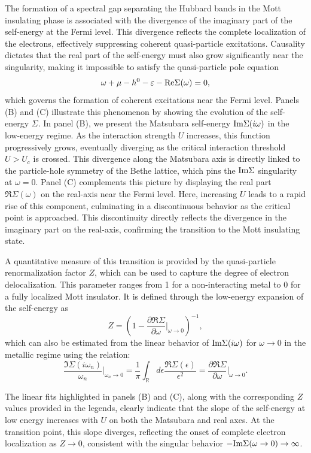 \documentclass[edipack_sp.tex]{subfiles}
\begin{document}
The formation of a spectral gap separating the Hubbard bands in the 
Mott insulating phase is associated with the divergence of the 
imaginary part of the self-energy at the Fermi level. This divergence 
reflects the complete localization of the electrons, effectively 
suppressing coherent quasi-particle excitations. Causality dictates that the real part of the self-energy must also 
grow significantly near the singularity, making it impossible to 
satisfy the quasi-particle pole equation
$$
\omega+\mu-h^0-\varepsilon-{\rm Re}{\Sigma}(\omega)=0,
$$
which governs the formation of coherent excitations near the Fermi 
level.
Panels (B) and (C) illustrate this phenomenon by showing the evolution of the self-energy $\Sigma$. In panel (B), we present the Matsubara self-energy ${\rm Im}\Sigma(i\omega)$ in the low-energy regime. As the  interaction strength $U$ increases, this function progressively grows, eventually diverging as the critical interaction threshold $U > U_\mathrm{c}$ is crossed.
This divergence along the Matsubara axis is directly linked to the
particle-hole symmetry of the Bethe lattice, which pins the  ${\rm
  Im}\Sigma$ singularity at $\omega = 0$.
Panel (C) complements this picture by displaying the real part 
$\Re{\Sigma}(\omega)$ on the real-axis near the Fermi level. Here, increasing $U$ leads to a rapid rise of this component, culminating in a discontinuous behavior as the critical point is approached. This 
discontinuity directly reflects the divergence in the imaginary part
on the real-axis, confirming the transition to the Mott insulating state.


A quantitative measure of this transition is provided by the 
quasi-particle renormalization factor $Z$, which can be used to capture the degree of electron delocalization. This parameter ranges from 1 for a non-interacting metal to 0 for a fully localized Mott insulator. It is 
defined through the low-energy expansion of the self-energy as
$$
Z=\left(1-\frac{\partial\Re\Sigma}{\partial\omega}\Biggr|_{\omega\rightarrow
    0}\right)^{-1},
$$
which can also be estimated from the linear behavior of ${\rm Im}\Sigma(i\omega)$ for 
$\omega\to0$ in the metallic regime using the relation:
$$
   \frac{\Im\Sigma(i\omega_n)}{\omega_n}\Biggr|_{\omega_n\rightarrow 0}=
   \frac{1}{\pi}\int_{\mathbb R}d\epsilon \frac{\Re\Sigma(\epsilon)}{\epsilon^2}=
   \frac{\partial\Re\Sigma}{\partial\omega}\Biggr|_{\omega\rightarrow 0}.
$$

The linear fits highlighted in panels (B) and (C), along with the 
corresponding $Z$ values provided in the legends, clearly indicate that 
the slope of the self-energy at low energy increases with $U$ on both 
the Matsubara and real axes. At the transition point, this slope 
diverges, reflecting the onset of complete electron localization as 
$Z \to 0$, consistent with the singular behavior  
$-{\rm Im}\Sigma(\omega\to0) \to\infty$.
\end{document}
